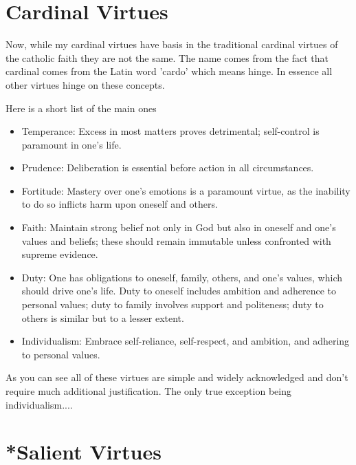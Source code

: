\section{Cardinal Virtues}
\par Now, while my cardinal virtues have basis in the traditional cardinal virtues of the catholic faith they are not the same. The name comes from the fact that cardinal comes from the Latin word 'cardo' which means hinge. In essence all other virtues hinge on these concepts.
\par Here is a short list of the main ones
\begin{itemize}
    \item Temperance: Excess in most matters proves detrimental; self-control is paramount in one’s life.
    \item Prudence: Deliberation is essential before action in all circumstances.
    \item Fortitude: Mastery over one’s emotions is a paramount virtue, as the inability to do so inflicts harm upon oneself and others.
    \item Faith: Maintain strong belief not only in God but also in oneself and one’s values and beliefs; these should remain immutable unless confronted with supreme evidence.
    \item  Duty: One has obligations to oneself, family, others, and one’s values, which should drive one’s life. Duty to oneself includes ambition and adherence to personal values; duty to family involves support and politeness; duty to others is similar but to a lesser extent.
    \item  Individualism: Embrace self-reliance, self-respect, and ambition, and adhering to personal values.
\end{itemize}
\par As you can see all of these virtues are simple and widely acknowledged and don't require much additional justification. The only true exception being individualism....
\section{*Salient Virtues}


